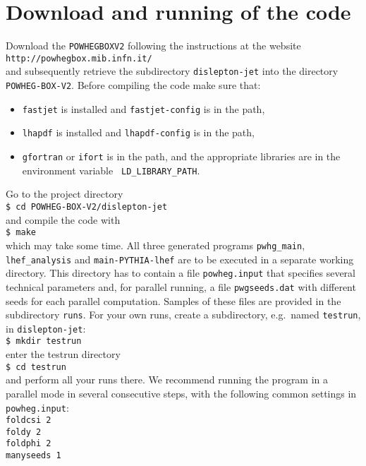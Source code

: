 \documentclass[a4paper,11pt]{article}
\newcommand\POWHEGBOXvTWO{{\tt POWHEG\;BOX\;V2}}
\begin{document}
\section*{Download and running of the code}
%
Download the \POWHEGBOXvTWO{} 
following the instructions at the website 
\\[2ex]
{\tt http://powhegbox.mib.infn.it/}
\\[2ex]
and subsequently retrieve the subdirectory {\tt dislepton-jet}
into the directory {\tt POWHEG-BOX-V2}.
Before compiling the code make sure that:
%
\begin{itemize}
\item 
{\tt fastjet} is installed and {\tt fastjet-config} is in the path,
\item 
{\tt lhapdf} is installed and {\tt lhapdf-config} is in the path,
\item
{\tt gfortran} or {\tt ifort} is in the path, and the
appropriate libraries are in the environment variable {\tt
  LD\_LIBRARY\_PATH}. 
\end{itemize}
%
Go to the project directory
\\[2ex]
{\tt \$ cd POWHEG-BOX-V2/dislepton-jet}
\\[2ex]
and compile the code with
\\[2ex]
{\tt \$ make}
\\[2ex]
which may take some time.
All three generated programs {\tt pwhg\_main},
{\tt lhef\_analysis} and {\tt main-PYTHIA-lhef}
are to be executed in a separate working directory. This directory has to 
contain a file {\tt powheg.input} that specifies several technical parameters
and, for parallel running, a file {\tt pwgseeds.dat}
with different seeds for each parallel computation.
Samples of these files are provided
in the subdirectory {\tt runs}.
For your own runs, create a subdirectory, e.g.\ named {\tt testrun}, in {\tt dislepton-jet}:
\\[2ex]
{\tt \$ mkdir testrun}
\\[2ex]
enter the testrun directory
\\[2ex]
{\tt \$ cd testrun}
\\[2ex]
and perform all your runs there.
We recommend running the program in a parallel mode in several consecutive steps, with the following common settings in {\tt powheg.input}:
\\[2ex]
{\tt foldcsi   2}
\\
{\tt foldy     2}
\\
{\tt foldphi   2}
\\
{\tt manyseeds   1}
\end{document}
